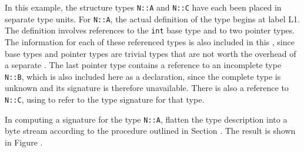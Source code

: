 In this example, the structure types \texttt{N::A} and \texttt{N::C} have each
been placed in separate 
type units.  For \texttt{N::A}, the actual
definition of the type begins at label L1. The definition
involves references to the \texttt{int} base type and to two pointer
types. The information for each of these referenced types is
also included in this , 
since base types and pointer
types are trivial types that are not worth the overhead of a
separate . 
The last pointer type contains a reference
to an incomplete type \texttt{N::B}, which is also included here as
a declaration, since the complete type is unknown and its
signature is therefore unavailable. There is also a reference
to \texttt{N::C}, using 
 to 
refer to the type signature
for that type.

In computing a signature for the type \texttt{N::A}, flatten the type
description into a byte stream according to the procedure
outlined in 
Section .
The result is shown in 
Figure .

